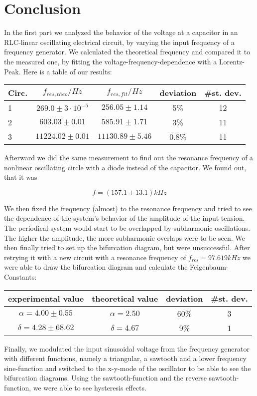 \clearpage
\section{Conclusion}

In the first part we analyzed the behavior of the voltage at a capacitor in an RLC-linear oscillating electrical circuit, by varying the input frequency of a frequency generator. We calculated the theoretical frequency and compared it to the measured one, by fitting the voltage-frequency-dependence with a Lorentz-Peak. Here is a table of our results:

\begin{center}
\begin{tabular}{l c c c c}
Circ. & $f_{res,theo}/Hz$ & $f_{res,fit}/Hz$ & deviation & \#st. dev.\\ \hline
1 & $269.0\pm 3\cdot10^{-5}$ & $256.05\pm1.14$ & 5\% & 12\\
2 & $603.03\pm0.01$ & $585.91\pm1.71$ & 3\% & 11\\
3 & $11224.02\pm0.01$ & $11130.89\pm5.46$ & 0.8\% & 11\\
\end{tabular}
\end{center}

Afterward we did the same measurement to find out the resonance frequency of a nonlinear oscillating circle with a diode instead of the capacitor. We found out, that it was 

$$f=(157.1\pm13.1)kHz$$

We then fixed the frequency (almost) to the resonance frequency and tried to see the dependence of the system's behavior of the amplitude of the input tension. The periodical system would start to be overlapped by subharmonic oscillations. The higher the amplitude, the more subharmonic overlaps were to be seen. We then finally tried to set up the bifurcation diagram, but were unsuccessful. After retrying it with a new circuit with a resonance frequency of $f_{res}=97.619 kHz$ we were able to draw the bifurcation diagram and calculate the Feigenbaum-Constants:

\begin{center}
\begin{tabular}{c c c c}
experimental value & theoretical value & deviation & \#st. dev.\\ \hline
$\alpha = 4.00\pm0.55 $ & $\alpha = 2.50$ & 60\% & 3\\
$\delta = 4.28 \pm68.62$ & $\delta = 4.67$ & 9\% & 1\\
\end{tabular}
\end{center}

Finally, we modulated the input sinusoidal voltage from the frequency generator with different functions, namely a triangular, a sawtooth and a lower frequency sine-function and switched to the x-y-mode of the oscillator to be able to see the bifurcation diagrams. Using the sawtooth-function and the reverse sawtooth-function, we were able to see hysteresis effects.